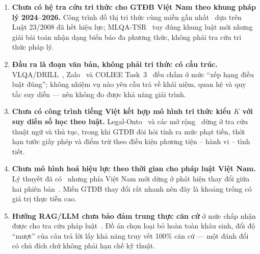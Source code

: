 \begin{enumerate}
  \item \textbf{Chưa có hệ tra cứu tri thức cho GTĐB Việt Nam theo khung pháp lý 2024--2026.}
        Công trình đồ thị tri thức cùng miền gần nhất~\cite{dangKG} dựa trên Luật 23/2008 đã
        hết hiệu lực; MLQA-TSR~\cite{mlqatsr} tuy đúng khung luật mới nhưng giải bài toán
        nhận dạng biển báo đa phương thức, không phải tra cứu tri thức pháp lý.
  \item \textbf{Đầu ra là đoạn văn bản, không phải tri thức có cấu trúc.}
        VLQA/DRILL~\cite{vlqa,drill}, Zalo~\cite{zalo} và COLIEE Task~3~\cite{coliee} đều
        chấm ở mức ``xếp hạng điều luật đúng''; không nhiệm vụ nào yêu cầu trả về khái niệm,
        quan hệ và quy tắc suy diễn --- nên không đo được khả năng giải trình.
  \item \textbf{Chưa có công trình tiếng Việt kết hợp mô hình tri thức kiểu $K$ với suy diễn
        số học theo luật.} Legal-Onto~\cite{legalonto} và các mở
        rộng~\cite{phamLabor,phamLegalOntoUpdate,phamUnified} dừng ở tra cứu thuật ngữ và thủ
        tục, trong khi GTĐB đòi hỏi tính ra mức phạt tiền, thời hạn tước giấy phép và điểm
        trừ theo điều kiện phương tiện -- hành vi -- tình tiết.
  \item \textbf{Chưa mô hình hoá hiệu lực theo thời gian cho pháp luật Việt Nam.} Lý thuyết
        đã có~\cite{governatori,palmirani,legalruleml,demartim} nhưng phía Việt Nam mới dừng ở
        phát hiện thay đổi giữa hai phiên bản~\cite{phamLegalOntoUpdate}. Miền GTĐB thay đổi
        rất nhanh nên đây là khoảng trống có giá trị thực tiễn cao.
  \item \textbf{Hướng RAG/LLM chưa bảo đảm trung thực căn cứ} ở mức chấp nhận được cho tra
        cứu pháp luật~\cite{dahl,magesh,alce}. Đồ án chọn loại bỏ hoàn toàn khâu sinh, đổi độ
        ``mượt'' của câu trả lời lấy khả năng truy vết 100\% căn cứ --- một đánh đổi có chủ
        đích chứ không phải hạn chế kỹ thuật.
\end{enumerate}
